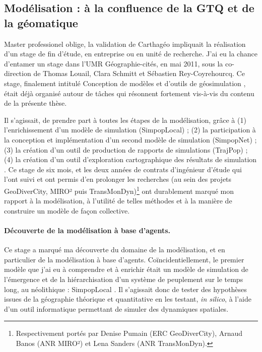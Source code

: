 \subsection{Modélisation : à la confluence de la GTQ et de la géomatique}

Master professionel oblige, la validation de Carthagéo impliquait la réalisation d'un stage de fin d'étude, en entreprise ou en unité de recherche.
J'ai eu la chance d'entamer un stage dans l'UMR Géographie-cités, en mai 2011, sous la co-direction de Thomas Louail, Clara Schmitt et Sébastien Rey-Coyrehourcq.
Ce stage, finalement intitulé \og Conception de modèles et d’outils de géosimulation \fg{} \autocite{cura_conception_2011}, était déjà organisé autour de tâches qui résonnent fortement vis-à-vis du contenu de la présente thèse.

Il s'agissait, de \og prendre part à toutes les étapes de la modélisation\fg{}, grâce à (1) l'enrichissement d'un modèle de simulation (SimpopLocal) ; (2) la participation à la conception et implémentation d'un second modèle de simulation (SimpopNet) ; (3) la création d'un outil de production de rapports de simulations (TrajPop) ; (4) la création d'un outil d'exploration cartographique des résultats de simulation \autocite[12-13]{cura_conception_2011}.
Ce stage de six mois, et les deux années de contrats d'ingénieur d'étude qui l'ont suivi et ont permis d'en prolonger les recherches (au sein des projets GeoDiverCity, MIRO² puis TransMonDyn)\footnote{
	Respectivement portés par Denise Pumain (ERC GeoDiverCity), Arnaud Banos (ANR MIRO²) et Lena Sanders (ANR TransMonDyn).
} ont durablement marqué mon rapport à la modélisation, à l'utilité de telles méthodes et à la manière de construire un modèle de façon collective.

\paragraph{Découverte de la modélisation à base d'agents.}
Ce stage a marqué ma découverte du domaine de la modélisation, et en particulier de la modélisation à base d'agents.
Coïncidentiellement, le premier modèle que j'ai eu à comprendre et à enrichir était un modèle de simulation de l'émergence et de la hiérarchisation d'un système de peuplement sur le temps long, au néolithique : SimpopLocal \autocite{schmitt_modelisation_2014,rey-coyrehourcq_plateforme_2015}.
Il s'agissait donc de tester des hypothèses issues de la géographie théorique et quantitative en les testant, \textit{in silico}, à l'aide d'un outil informatique permettant de simuler des dynamiques spatiales.

